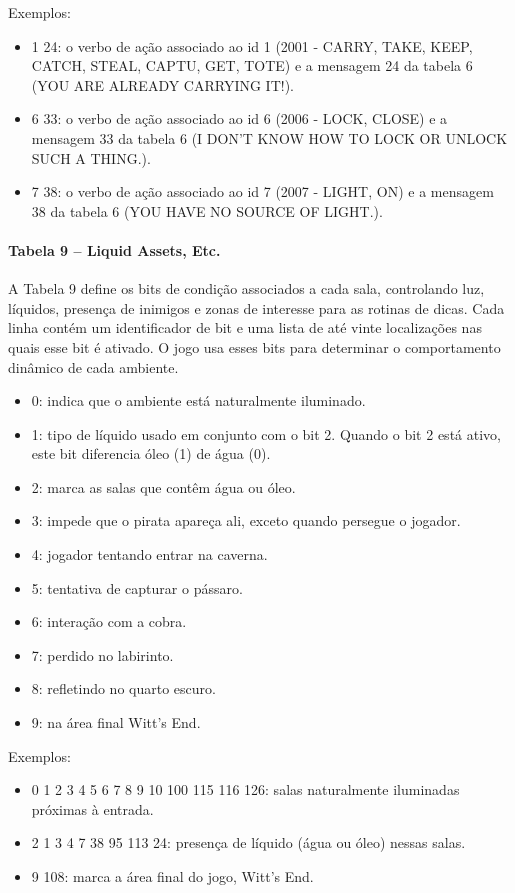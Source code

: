 \documentclass[12pt,a4paper]{article}
\begin{document}
Exemplos:  
\begin{itemize}
  \item 1 24: o verbo de ação associado ao id 1 (2001 - CARRY, TAKE, KEEP, CATCH, STEAL, CAPTU, GET, TOTE) e a mensagem 24 da tabela 6 (YOU ARE ALREADY CARRYING IT!). 
  \item 6 33: o verbo de ação associado ao id 6 (2006 - LOCK, CLOSE) e a mensagem 33 da tabela 6 (I DON'T KNOW HOW TO LOCK OR UNLOCK SUCH A THING.).
  \item 7 38: o verbo de ação associado ao id 7 (2007 - LIGHT, ON) e a mensagem 38 da tabela 6 (YOU HAVE NO SOURCE OF LIGHT.). 
\end{itemize}

\paragraph{Tabela 9 – Liquid Assets, Etc.}
A Tabela 9 define os bits de condição associados a cada sala, controlando luz, líquidos, presença de inimigos e zonas de interesse para as rotinas de dicas. Cada linha contém um identificador de bit e uma lista de até vinte localizações nas quais esse bit é ativado. O jogo usa esses bits para determinar o comportamento dinâmico de cada ambiente.

\begin{itemize}
  \item 0: indica que o ambiente está naturalmente iluminado.
  \item 1: tipo de líquido usado em conjunto com o bit 2. Quando o bit 2 está ativo, este bit diferencia óleo (1) de água (0).
  \item 2: marca as salas que contêm água ou óleo.
  \item 3: impede que o pirata apareça ali, exceto quando persegue o jogador.
  \item 4: jogador tentando entrar na caverna.
  \item 5: tentativa de capturar o pássaro.
  \item 6: interação com a cobra.
  \item 7: perdido no labirinto.
  \item 8: refletindo no quarto escuro.
  \item 9: na área final Witt's End.
\end{itemize}

Exemplos:
\begin{itemize}
  \item 0 1 2 3 4 5 6 7 8 9 10 100 115 116 126: salas naturalmente iluminadas próximas à entrada.
  \item 2 1 3 4 7 38 95 113 24: presença de líquido (água ou óleo) nessas salas.
  \item 9 108: marca a área final do jogo, Witt’s End.
\end{itemize}
\end{document}
